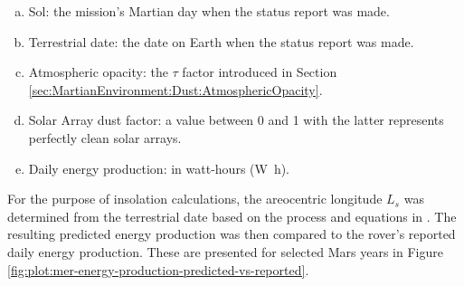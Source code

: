 \begin{enumerate}[(a)]
  \item Sol: the mission's Martian day when the status report was made.
  \item Terrestrial date: the date on Earth when the status report was made.
  \item Atmospheric opacity: the $\tau$ factor introduced in Section \ref{sec:MartianEnvironment:Dust:AtmosphericOpacity}.
  \item Solar Array dust factor: a value between 0 and 1 with the latter represents perfectly clean solar arrays.
  \item Daily energy production: in watt-hours (\si{\watt\hour}).
\end{enumerate}

For the purpose of insolation calculations, the areocentric longitude $L_{s}$ was determined from the terrestrial date based on the process and equations in . The resulting predicted energy production was then compared to the rover's reported daily energy production. These are presented for selected Mars years in Figure \ref{fig:plot:mer-energy-production-predicted-vs-reported}.

